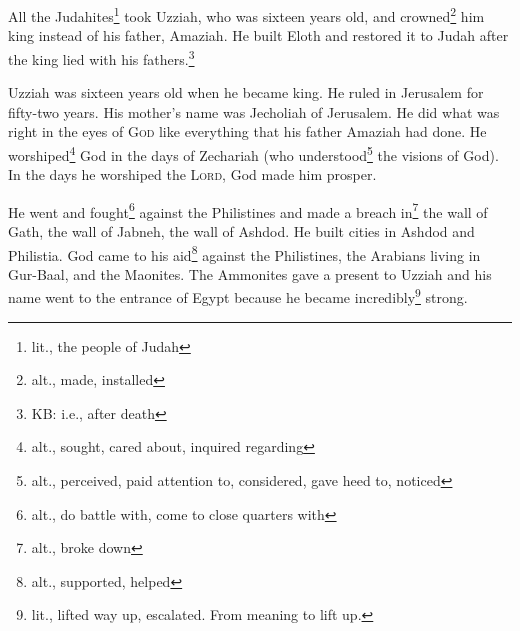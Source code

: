 
\begin{inparaenum}
     All the Judahites\footnote{lit., the people of Judah} took Uzziah, who was sixteen years old, and crowned\footnote{alt., made, installed} him king instead of his father, Amaziah.%
     He built Eloth and restored it to Judah after the king lied with his fathers.\footnote{KB: i.e., after death}%
    
     Uzziah was sixteen years old when he became king. He ruled in Jerusalem for fifty-two years. His mother's name was Jecholiah of Jerusalem.%
     He did what was right in the eyes of \textsc{God} like everything that his father Amaziah had done.%
     He worshiped\footnote{alt., sought, cared about, inquired regarding} God in the days of Zechariah (who understood\footnote{alt., perceived, paid attention to, considered, gave heed to, noticed} the visions of God). In the days he worshiped the \textsc{Lord}, God made him prosper.%
    
     He went and fought\footnote{alt., do battle with, come to close quarters with} against the Philistines and made a breach in\footnote{alt., broke down} the wall of Gath, the wall of Jabneh, the wall of Ashdod. He built cities in Ashdod and Philistia.%
     God came to his aid\footnote{alt., supported, helped} against the Philistines, the Arabians living in Gur-Baal, and the Maonites.%
     The Ammonites gave a present to Uzziah and his name went to the entrance of Egypt because he became incredibly\footnote{lit., lifted way up, escalated. From  meaning to lift up.} strong.%
    

\end{inparaenum}
